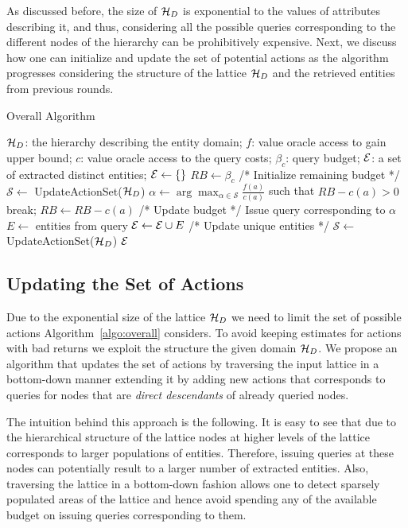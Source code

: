 As discussed before, the size of $\mathcal{H}_D$ is exponential to the values of attributes describing it, and thus, considering all the possible queries corresponding to the different nodes of the hierarchy can be prohibitively expensive. Next, we discuss how one can initialize and update the set of potential actions as the algorithm progresses considering the structure of the lattice $\mathcal{H}_D$ and the retrieved entities from previous rounds. 

\begin{algorithm}[h]
\small\caption{Overall Algorithm}
\label{algo:overall}
\begin{algorithmic}[1]
 $\mathcal{H}_D$: the hierarchy describing the entity domain; $f$: value oracle access to gain upper bound; $c$: value oracle access to the query costs; $\beta_c$: query budget;
 $\mathcal{E}$: a set of extracted distinct entities;
\STATE $\mathcal{E} \leftarrow \{\}$
\STATE $RB \leftarrow \beta_c$ /* Initialize remaining budget */
\STATE $\mathcal{S} \leftarrow$ {\sf UpdateActionSet($\mathcal{H}_D$)}
	\STATE $\alpha \leftarrow \arg\max_{\alpha \in {\mathcal{S}}} \frac{f(a)}{c(a)}$ such that $RB - c(a) >0$
		\STATE break;
	\ENDIF
	\STATE $RB \leftarrow RB - c(a)$ /* Update budget */
	\STATE Issue query corresponding to $\alpha$
	\STATE $E \leftarrow$ entities from query
	\STATE $\mathcal{E} \leftarrow \mathcal{E} \cup E$ /* Update unique entities */
	\STATE $\mathcal{S} \leftarrow$ {\sf UpdateActionSet($\mathcal{H}_D$)}
\ENDWHILE
\RETURN $\mathcal{E}$
\end{algorithmic}
\end{algorithm}

\subsection{Updating the Set of Actions}
Due to the exponential size of the lattice $\mathcal{H}_D$ we need to limit the set of possible actions Algorithm~\ref{algo:overall} considers. To avoid keeping estimates for actions with bad returns we exploit the structure the given domain $\mathcal{H}_D$. We propose an algorithm that updates the set of actions by traversing the input lattice in a bottom-down manner extending it by adding new actions that corresponds to queries for nodes that are {\em direct descendants} of already queried nodes.

The intuition behind this approach is the following. It is easy to see that due to the hierarchical structure of the lattice nodes at higher levels of the lattice corresponds to larger populations of entities. Therefore, issuing queries at these nodes can potentially result to a larger number of extracted entities. Also, traversing the lattice in a bottom-down fashion allows one to detect sparsely populated areas of the lattice and hence avoid spending any of the available budget on issuing queries corresponding to them.

